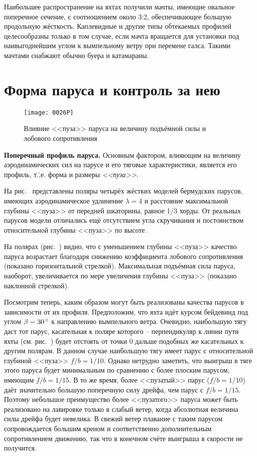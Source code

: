 Наибольшее распространение на яхтах получили мачты, имеющие овальное
поперечное сечение, с соотношением около 3:2, обеспечивающее большую
продольную жёсткость. Каплевидные и другие типы обтекаемых профилей
целесообразны только в том случае, если мачта вращается для установки
под наивыгоднейшим углом к вымпельному ветру при перемене
галса. Такими мачтами снабжают обычно буера и катамараны.

\section{Форма паруса и контроль за нею}

\begin{figure}[htb]
  \centering
  \texttt{[image: 0026P]}
  \caption{Влияние <<пуза>> паруса на величину подъёмной силы и лобового сопротивления}
  \label{fig:26}
\end{figure}

\textbf{Поперечный профиль паруса.}
Основным фактором, влияющим на величину аэродинамических сил на парусе
и его тяговые характеристики, является его профиль, т.\=,е. форма и
размеры \textit{<<пуза>>}.

На рис.~ представлены поляры четырёх жёстких моделей
бермудских парусов, имеющих аэродинамическое удлинение $\lambda = 4$ и
расстояние максимальной глубины <<пуза>> от передней шкаторины, равное
1/3 хорды. От реальных парусов модели отличались ещё отсутствием угла
скручивания и постоянством относительной глубины <<пуза>> по высоте.

На полярах (рис.~) видно, что с уменьшением глубины <<пуза>>
качество паруса возрастает благодаря снижению коэффициента лобового
сопротивления (показано горизонтальной стрелкой). Максимальная
подъёмная сила паруса, наоборот, увеличивается по мере увеличения
глубины <<пуза>> (показано наклонной стрелкой).

Посмотрим теперь, каким образом могут быть реализованы качества
парусов в зависимости от их профиля. Предположим, что яхта идёт курсом
бейдевинд под углом $\beta = 30\,^\circ$ к направлению вымпельного
ветра. Очевидно, наибольшую тягу даст тот парус, касательная к поляре
которого \--- перпендикуляр к линии пути яхты (см. рис.~)
будет отстоять от точки 0 дальше подобных же касательных к другим
полярам. В данном случае наибольшую тягу имеет парус с относительной
глубиной <<пуза>> $f/b=1/10$. Однако нетрудно заметить, что выигрыш в
тяге этого паруса будет минимальным по сравнению с более плоским
парусом, имеющим $f/b = 1/15$. В то же время, более <<пузатый>> парус
($f/b = 1/10$) даёт значительно большую поперечную силу дрейфа, чем
парус с $f/b = 1/15$. Поэтому небольшое преимущество более
<<пузатого>> паруса может быть реализовано на лавировке только в
слабый ветер, когда абсолютная величина силы дрейфа будет невелика. В
свежий ветер плавание с таким парусом сопровождается большим креном и
соответственно дополнительным сопротивлением движению, так что в
конечном счёте выигрыша в скорости не получится.

